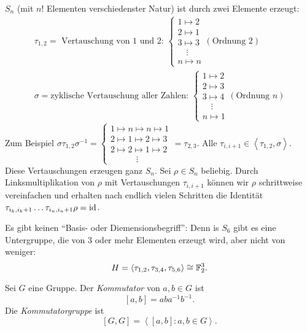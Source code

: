\begin{eg}
	$S_{n}$ (mit $n!$ Elementen verschiedenster Natur) ist durch zwei Elemente erzeugt:
	\begin{align*}
		\tau_{1,2} = \text{ Vertauschung von $1$ und $2$: } \begin{cases}
			1 \mapsto 2\\ 2 \mapsto 1 \\ 3 \mapsto 3\\ \quad \vdots\\ n \mapsto n
		\end{cases} (\text{Ordnung } 2)\\
		\sigma = \text{zyklische Vertauschung aller Zahlen: } \begin{cases}
			1 \mapsto 2\\ 2 \mapsto 3\\ 3 \mapsto 4 \\ \quad\vdots \\ n\mapsto 1
		\end{cases} (\text{Ordnung } n)
	\end{align*}
	Zum Beispiel $\sigma \tau_{1,2} \sigma^{-1} = \begin{cases}
		1 \mapsto n \mapsto  n \mapsto  1\\
		2  \mapsto 1 \mapsto 2 \mapsto 3\\
		2 \mapsto 2 \mapsto 1 \mapsto 2\\
		\qquad\quad\vdots
	\end{cases} = \tau_{2,3}$. Alle $\tau_{i,i+1} \in \left< \tau_{1,2}, \sigma \right>$.
	Diese Vertauschungen erzeugen ganz $S_{n}$.
	Sei $\rho \in S_{n}$ beliebig. Durch Linksmultiplikation von $\rho$ mit Vertauschungen $\tau_{i,i+1}$ können wir $\rho$ schrittweise vereinfachen
	und erhalten nach endlich vielen Schritten die Identität $\tau_{i_{k},i_{k}+1} \ldots \tau_{i_{n}, i_{n} + 1} \rho = \operatorname{id}$.
\end{eg}

\begin{remark}
	Es gibt keinen \enquote{Basis- oder Diemensionsbegriff}:
	Denn is $S_{6}$ gibt es eine Untergruppe, die von $3$ oder mehr Elementen erzeugt wird, aber nicht von weniger:
	\[
	H = \left< \tau_{1,2}, \tau_{3,4}, \tau_{5,6} \right> \cong \mathbb{F}_{2}^{3}
	.\] 
\end{remark}

\begin{definition}
	Sei $G$ eine Gruppe. Der \emph{Kommutator} von $a,b \in G$ ist 
	\[
		[a,b] = ab a^{-1} b^{-1}
	.\]
	Die \emph{Kommutatorgruppe} ist
	\[
		[G,G] = \left< [a,b]: a,b \in G \right>
	.\] 
\end{definition}


























